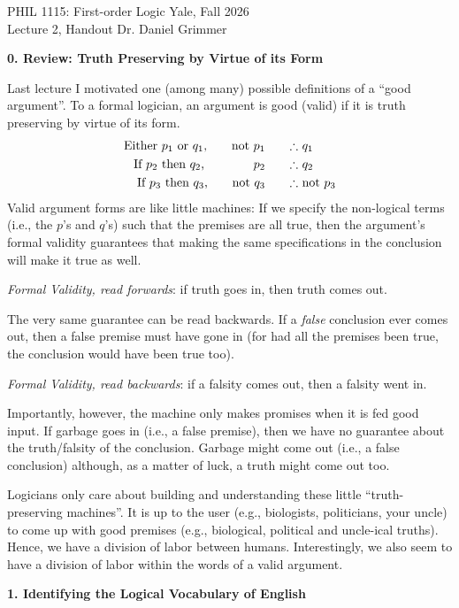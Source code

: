\documentclass[options]{philosophersimprint}
\theoremstyle{definition}
\begin{document}
PHIL 1115: First-order Logic \hfill Yale, Fall 2026\\
Lecture 2, Handout \hfill Dr. Daniel Grimmer

\textbf{0. Review: Truth Preserving by Virtue of its Form}

Last lecture I motivated one (among many) possible definitions of a ``good argument''. To a formal logician, an argument is good (valid) if it is truth preserving by virtue of its form.
\begin{align}
\text{Either $p_1$ or $q_1$,\qquad not $p_1$\qquad}
&\text{$\therefore$ $q_1$}\\
\text{If $p_2$ then $q_2$,\qquad\qquad  $p_2$\qquad}
&\text{$\therefore$ $q_2$}\\
\text{If $p_3$ then $q_3$,\qquad  not $q_3$\qquad}
&\text{$\therefore$ not $p_3$}
\end{align}
Valid argument forms are like little machines: If we specify the non-logical terms (i.e., the $p$'s and $q$'s) such that the premises are all true, then the argument's formal validity guarantees that making the same specifications in the conclusion will make it true as well.

\textit{Formal Validity, read forwards}: if truth goes in, then truth comes out.

The very same guarantee can be read backwards. If a \textit{false} conclusion ever comes out, then a false premise must have gone in (for had all the premises been true, the conclusion would have been true too).

\textit{Formal Validity, read backwards}: if a falsity comes out, then a falsity went in.

Importantly, however, the machine only makes promises when it is fed good input. If garbage goes in (i.e., a false premise), then we have no guarantee about the truth/falsity of the conclusion. Garbage might come out (i.e., a false conclusion) although, as a matter of luck, a truth might come out too.

Logicians only care about building and understanding these little ``truth-preserving machines''. It is up to the user (e.g., biologists, politicians, your uncle) to come up with good premises (e.g., biological, political and uncle-ical truths). Hence, we have a division of labor between humans. Interestingly, we also seem to have a division of labor within the words of a valid argument.

\textbf{1. Identifying the Logical Vocabulary of English}
\end{document}
